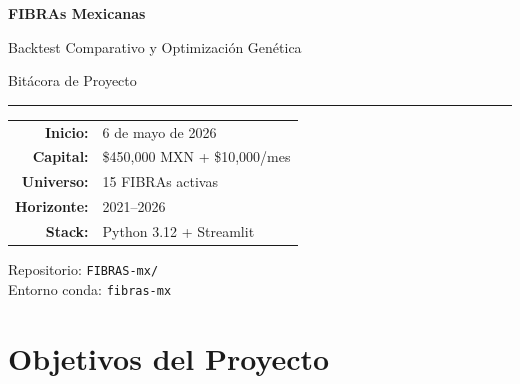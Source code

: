 \documentclass[12pt, a4paper]{article}
\begin{document}
\begin{titlepage}
  \centering
  \vspace*{3cm}
  {\Huge\bfseries\color{fibra-blue} FIBRAs Mexicanas\par}
  \vspace{0.5cm}
  {\Large Backtest Comparativo y Optimizaci\'{o}n Gen\'{e}tica\par}
  \vspace{2cm}
  {\large\color{fibra-gray} Bit\'{a}cora de Proyecto\par}
  \vspace{0.5cm}
  \rule{0.6\textwidth}{0.4pt}
  \vspace{0.5cm}

  \begin{tabular}{rl}
    \textbf{Inicio:}     & 6 de mayo de 2026 \\
    \textbf{Capital:}    & \$450{,}000 MXN + \$10{,}000/mes \\
    \textbf{Universo:}   & 15 FIBRAs activas \\
    \textbf{Horizonte:}  & 2021--2026 \\
    \textbf{Stack:}      & Python 3.12 + Streamlit \\
  \end{tabular}

  \vspace{2cm}
  {\small\color{fibra-gray}
    Repositorio: \texttt{FIBRAS-mx/} \\
    Entorno conda: \texttt{fibras-mx}
  }
\end{titlepage}

\tableofcontents
\newpage

\section*{Objetivos del Proyecto}
\end{document}
